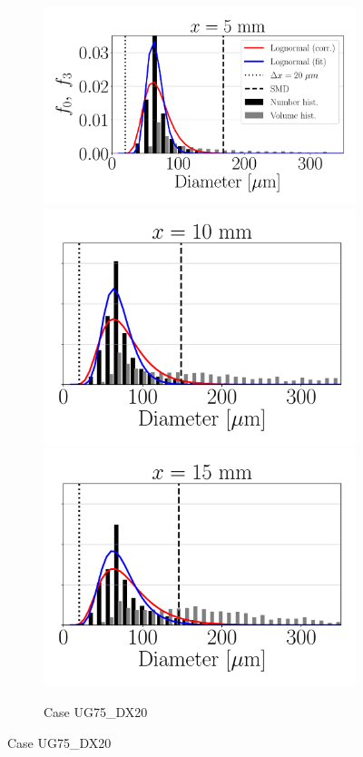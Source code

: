 \begin{figure}[ht]
\begin{subfigure}[b]{1.1\textwidth}
	\flushleft
   \includegraphics[scale=0.25]{./part2_developments/figures_ch5_resolved_JICF/SPRAY_characterization/histograms_size_volume/UG75_DX20_x05_histograms}
   \includegraphics[scale=0.25]{./part2_developments/figures_ch5_resolved_JICF/SPRAY_characterization/histograms_size_volume/UG75_DX20_x10_histograms}
   \includegraphics[scale=0.25]{./part2_developments/figures_ch5_resolved_JICF/SPRAY_characterization/histograms_size_volume/UG75_DX20_x15_histograms}
	\caption{Case UG75\_DX20}
\end{subfigure}



\end{figure}
